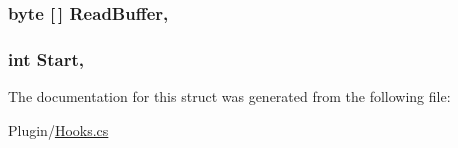 \subsubsection[{Read\+Buffer}]{\setlength{\rightskip}{0pt plus 5cm}byte \mbox{[}$\,$\mbox{]} Read\+Buffer\hspace{0.3cm}{\ttfamily [get]}, {\ttfamily [set]}}\label{structOTA_1_1Plugin_1_1HookArgs_1_1UnkownReceivedPacket_a5d469dd98be6477953e8b709e687f37b}
\hypertarget{structOTA_1_1Plugin_1_1HookArgs_1_1UnkownReceivedPacket_a0b2c355629c0c41a383ab8db641304ee}{}
\subsubsection[{Start}]{\setlength{\rightskip}{0pt plus 5cm}int Start\hspace{0.3cm}{\ttfamily [get]}, {\ttfamily [set]}}\label{structOTA_1_1Plugin_1_1HookArgs_1_1UnkownReceivedPacket_a0b2c355629c0c41a383ab8db641304ee}


The documentation for this struct was generated from the following file\+:\begin{DoxyCompactItemize}
\item 
Plugin/\hyperlink{Hooks_8cs}{Hooks.\+cs}\end{DoxyCompactItemize}

